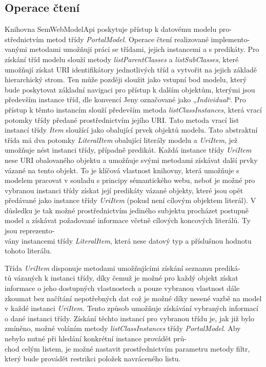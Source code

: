 \documentclass{projekt}
\begin{document}
\subsection{Operace čtení}
\hspace{0.65cm}Knihovna SemWebModelApi poskytuje přístup k datovému modelu pro-\\střednictvím metod třídy {\it PortalModel}. Operace čtení realizované implemento-\\vanými metodami umožňují práci se třídami, jejich instancemi a s predikáty. Pro získání tříd modelu slouží metody {\it listParentClasses} a {\it listSubClasses}, které umožňují získat URI identifikátory jednotlivých tříd a vytvořit na jejich základě hierarchický strom. Ten může později sloužit jako vstupní bod modelu, který bude poskytovat základní navigaci pro přístup k dalším objektům, kterými jsou především instance tříd, dle konvencí Jeny označované jako „{\it Individual}“. Pro přístup k těmto instancím slouží především metoda {\it listClassInstances}, která vrací potomky třídy předané prostřednictvím jejího URI. Tato metoda vrací list instancí třídy {\it Item} sloužící jako obalující prvek objektů modelu. Tato abstraktní třída má dva potomky {\it LiteralItem} obalující literály modelu a {\it UriItem}, jež umožňuje nést instanci třídy, případně predikát. Každá instance třídy {\it UriItem} nese URI obalovaného objektu a umožňuje svými metodami získávat další prvky vázané na tento objekt. To je klíčová vlastnost knihovny, která umožňuje s  modelem pracovat v souladu s principy sémantického webu, neboť je možné pro vybranou instanci třídy získat její predikáty vázané objekty, které jsou opět předávané jako instance třídy {\it UriItem} (pokud není cílovým objektem literál). V důsledku je tak možné prostřednictvím jediného subjektu procházet postupně model a získávat požadované informace včetně cílových  koncových literálů. Ty jsou reprezento-\\vány instancemi třídy {\it LiteralItem}, která nese datový typ a příslušnou hodnotu tohoto literálu.

Třída {\it UriItem} disponuje metodami umožňujícími získání seznamu prediká-\\tů vázaných k instanci třídy, díky čemuž je možné pro každý objekt získat informace o jeho dostupných vlastnostech a pouze vybranou vlastnost dále zkoumat bez načítání nepotřebných dat což je možné díky nesené vazbě na model v každé instanci {\it UriItem}. Tento způsob umožňuje získávání vybraných informací o dané instanci třídy. Získání těchto instancí pro vybranou třídu je, jak již bylo zmíněno, možné voláním metody {\it listClassInstances} třídy {\it PortalModel}. Aby nebylo nutné při hledání konkrétní instance provádět prů-\\chod celým listem, je možné nastavit prostřednictvím parametru metody filtr, který bude provádět restrikci položek navráceného listu. 
\end{document}
